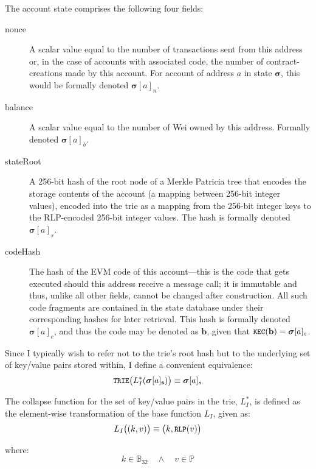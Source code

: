 \documentclass[9pt,oneside]{amsart}
\begin{document}
\begin{multicols}{2}
The account state comprises the following four fields:

\begin{description}
\item[nonce] A scalar value equal to the number of transactions sent from this address or, in the case of accounts with associated code, the number of contract-creations made by this account. For account of address $a$ in state $\boldsymbol{\sigma}$, this would be formally denoted $\boldsymbol{\sigma}[a]_n$.
\item[balance] A scalar value equal to the number of Wei owned by this address. Formally denoted $\boldsymbol{\sigma}[a]_b$.
\item[stateRoot] A 256-bit hash of the root node of a Merkle Patricia tree that encodes the storage contents of the account (a mapping between 256-bit integer values), encoded into the trie as a mapping from the 256-bit integer keys to the RLP-encoded 256-bit integer values. The hash is formally denoted $\boldsymbol{\sigma}[a]_s$.
\item[codeHash] The hash of the EVM code of this account---this is the code that gets executed should this address receive a message call; it is immutable and thus, unlike all other fields, cannot be changed after construction. All such code fragments are contained in the state database under their corresponding hashes for later retrieval. This hash is formally denoted $\boldsymbol{\sigma}[a]_c$, and thus the code may be denoted as $\mathbf{b}$, given that $\texttt{\small KEC}(\mathbf{b}) = \boldsymbol{\sigma}[a]_c$.
\end{description}

Since I typically wish to refer not to the trie's root hash but to the underlying set of key/value pairs stored within, I define a convenient equivalence:
\begin{equation}
\texttt{\small TRIE}\big(L_I^*(\boldsymbol{\sigma}[a]_\mathbf{s})\big) \equiv \boldsymbol{\sigma}[a]_s
\end{equation}

The collapse function for the set of key/value pairs in the trie, $L_I^*$, is defined as the element-wise transformation of the base function $L_I$, given as:
\begin{equation}
L_I\big( (k, v) \big) \equiv \big(k, \texttt{\small RLP}(v)\big)
\end{equation}

where:
\begin{equation}
k \in \mathbb{B}_{32} \quad \wedge \quad v \in \mathbb{P}
\end{equation}


\end{multicols}
\end{document}
